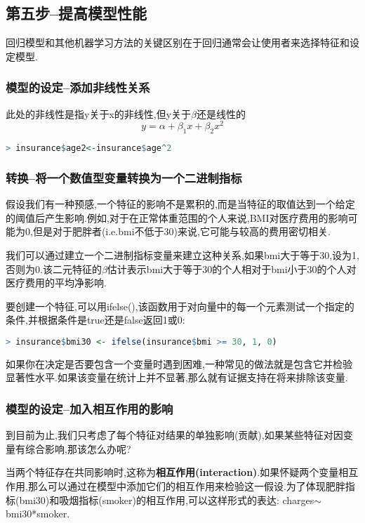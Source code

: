\documentclass[11pt,a4paper,oneside]{book}
\begin{document}
\subsection{第五步--提高模型性能}
回归模型和其他机器学习方法的关键区别在于回归通常会让使用者来选择特征和设定模型.
\subsubsection{模型的设定--添加非线性关系}
此处的非线性是指y关于x的非线性,但y关于$\beta$还是线性的
\begin{equation}
y=\alpha+\beta_1x+\beta_2x^2
\end{equation}

\begin{lstlisting}[language=r]
> insurance$age2<-insurance$age^2
\end{lstlisting}
\subsubsection{转换--将一个数值型变量转换为一个二进制指标}
假设我们有一种预感,一个特征的影响不是累积的,而是当特征的取值达到一个给定的阈值后产生影响.例如,对于在正常体重范围的个人来说,BMI对医疗费用的影响可能为0,但是对于肥胖者(i.e.bmi不低于30)来说,它可能与较高的费用密切相关.

我们可以通过建立一个二进制指标变量来建立这种关系,如果bmi大于等于30,设为1,否则为0.该二元特征的$\beta$估计表示bmi大于等于30的个人相对于bmi小于30的个人对医疗费用的平均净影响.

要创建一个特征,可以用ifelse(),该函数用于对向量中的每一个元素测试一个指定的条件,并根据条件是true还是false返回1或0:

\begin{lstlisting}[language=r]
> insurance$bmi30 <- ifelse(insurance$bmi >= 30, 1, 0)
\end{lstlisting}
\begin{tcolorbox}[colback=pink!10!white,colframe=pink!100!black]
如果你在决定是否要包含一个变量时遇到困难,一种常见的做法就是包含它并检验显著性水平.如果该变量在统计上并不显著,那么就有证据支持在将来排除该变量.
\end{tcolorbox}

\subsubsection{模型的设定--加入相互作用的影响}
到目前为止,我们只考虑了每个特征对结果的单独影响(贡献),如果某些特征对因变量有综合影响,那该怎么办呢?

当两个特征存在共同影响时,这称为\textbf{相互作用(interaction)}.如果怀疑两个变量相互作用,那么可以通过在模型中添加它们的相互作用来检验这一假设.为了体现肥胖指标(bmi30)和吸烟指标(smoker)的相互作用,可以这样形式的表达: charges$\sim$ bmi30*smoker.
\end{document}
